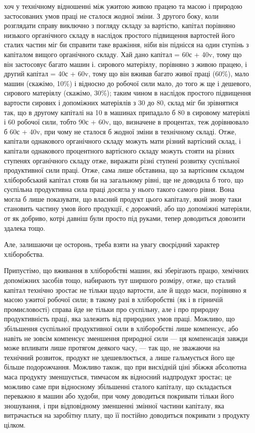 хоч у технічному відношенні між ужитою живою працею та масою і природою
застосованих умов праці не сталося жодної зміни. З другого боку, коли розглядати
справу виключно з погляду складу за вартістю, капітал порівняно низького
органічного складу в наслідок простого підвищення вартостей його сталих частин
міг би справити таке вражіння, ніби він піднісся на один ступінь з капіталом
вищого органічного складу. Хай дано капітал = 60с + 40v, тому що він
застосовує багато машин і. сирового матеріялу, порівняно з живою працею, і
другий капітал = 40с + 60v, тому що він вживав багато живої праці (60\%),
мало машин (скажімо, 10\%) і відносно до робочої сили мало, до того ж
ще і дешевого, сирового матеріялу (скажімо, 30\%); таким чином в наслідок простого
підвищення вартости сирових і допоміжних матеріялів з 30 до 80, склад
міг би зрівнятися так, що в другому капіталі на 10 в машинах припадало б 80
в сировому матеріялі і 60 робочої сили, тобто 90с + 60v, що, визначене в процентах,
теж дорівнювало б 60с + 40v, при чому не сталося б жодної зміни в технічному
складі. Отже, капітали однакового органічного складу можуть мати
різний вартісний склад, і капітали однакового процентного вартісного складу
можуть стояти на різних ступенях органічного складу отже, виражати різні ступені
розвитку суспільної продуктивної сили праці. Отже, сама лише обставина,
що за вартісним складом хліборобський капітал стояв би на загальному рівні, ще
не доводила б того, що суспільна продуктивна сила праці досягла у нього
такого самого рівня. Вона могла б лише показувати, що власний продукт цього
капіталу, який знову таки становить частину умов його продукції, є дорожчий,
або що допоміжні матеріяли, от як добриво, котрі давніш були просто під руками,
тепер доводиться довозити здалека тощо.

Але, залишаючи це осторонь, треба взяти на увагу своєрідний характер
хліборобства.

Припустімо, що вживання в хліборобстві машин, які зберігають працю,
хемічних допоміжних засобів тощо, набирають тут ширшого розміру, отже, що сталий
капітал технічно зростає не тільки щодо вартости, але й щодо маси, порівняно
я масою ужитої робочої сили; в такому разі в хліборобстві (як і в гірничій
промисловості) справа йде не тільки про суспільну, але і про природну продуктивність
праці, яка залежить від природних умов праці. Можливо, що збільшення
суспільної продуктивної сили в хліборобстві лише компенсує, або навіть
не зовсім компенсує зменшення природної сили — ця компенсація завжди може
впливати лише протягом деякого часу, — так що, не зважаючи на технічний
розвиток, продукт не здешевлюється, а лише гальмується його ще більше подорожчання.
Можливо також, що при висхідній ціні збіжжя абсолютна маса
продукту зменшується, тимчасом як відносний надпродукт зростає; це можливо
саме при відносному збільшенні сталого капіталу, що складається переважно
я машин або худоби, при чому доводиться покривати тільки його зношування,
і при відповідному зменшенні змінної частини капіталу, яка витрачається на
заробітну плату, що її постійно доводиться покривати з продукту цілком.

